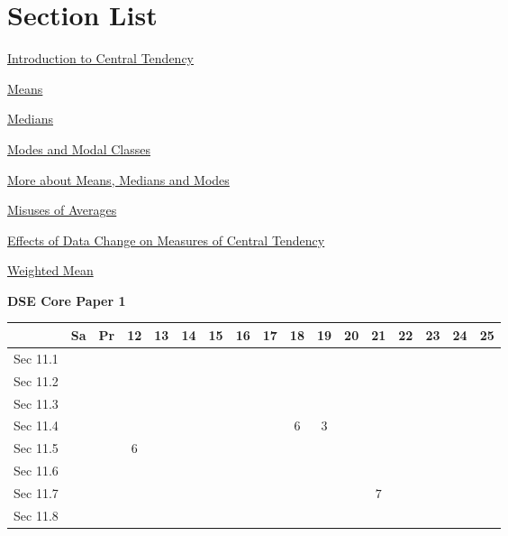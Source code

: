 \documentclass[12pt, a4paper]{article}
\begin{document}
\section*{Section List}
\begin{enumx}[label=Sec 11.\arabic*\ ]
\item \hyperref[section:3-11-1]{Introduction to Central Tendency }
\item \hyperref[section:3-11-2]{Means}
\item \hyperref[section:3-11-3]{Medians}
\item \hyperref[section:3-11-4]{Modes and Modal Classes}
\item \hyperref[section:3-11-5]{More about Means, Medians and Modes}
\item \hyperref[section:3-11-6]{Misuses of Averages}
\item \hyperref[section:3-11-7]{Effects of Data Change on Measures of Central Tendency \NF}
\item \hyperref[section:3-11-8]{Weighted Mean}
\end{enumx}
\begin{absolutelynopagebreak}
\begin{center}
\textbf{DSE Core Paper 1}
\end{center}
\begin{center}
\begin{tabular}{|l|c|c|c|c|c|c|c|c|c|c|c|c|c|c|c|c|}
\hline
        & Sa & Pr & 12 & 13 & 14 & 15 & 16 & 17 & 18 & 19 & 20 & 21 & 22 & 23 & 24 & 25 \\\hline\hline
Sec 11.1 &  &  &  &  &  &  &  &  &  &  &  &  &  &  &  &  \\\hline
Sec 11.2 &  &  &  &  &  &  &  &  &  &  &  &  &  &  &  &  \\\hline
Sec 11.3 &  &  &  &  &  &  &  &  &  &  &  &  &  &  &  &  \\\hline
Sec 11.4 &  &  &  &  &  &  &  &  &  $6$ &  $3$ &  &  &  &  &  &  \\\hline
Sec 11.5 &  &  &  $6$ &  &  &  &  &  &  &  &  &  &  &  &  &  \\\hline
Sec 11.6 &  &  &  &  &  &  &  &  &  &  &  &  &  &  &  &  \\\hline
Sec 11.7 &  &  &  &  &  &  &  &  &  &  &  &  $7$ &  &  &  &  \\\hline
Sec 11.8 &  &  &  &  &  &  &  &  &  &  &  &  &  &  &  &  \\\hline
\end{tabular}
\end{center}
\end{absolutelynopagebreak}
\end{document}
